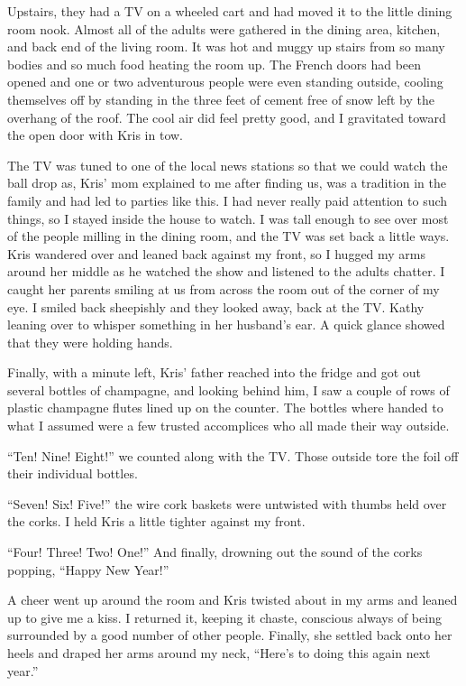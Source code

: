 Upstairs, they had a TV on a wheeled cart and had moved it to the little dining room nook.  Almost all of the adults were gathered in the dining area, kitchen, and back end of the living room.  It was hot and muggy up stairs from so many bodies and so much food heating the room up.  The French doors had been opened and one or two adventurous people were even standing outside, cooling themselves off by standing in the three feet of cement free of snow left by the overhang of the roof.  The cool air did feel pretty good, and I gravitated toward the open door with Kris in tow.

The TV was tuned to one of the local news stations so that we could watch the ball drop as, Kris' mom explained to me after finding us, was a tradition in the family and had led to parties like this.  I had never really paid attention to such things, so I stayed inside the house to watch.  I was tall enough to see over most of the people milling in the dining room, and the TV was set back a little ways.  Kris wandered over and leaned back against my front, so I hugged my arms around her middle as he watched the show and listened to the adults chatter.  I caught her parents smiling at us from across the room out of the corner of my eye.  I smiled back sheepishly and they looked away, back at the TV.  Kathy leaning over to whisper something in her husband's ear.  A quick glance showed that they were holding hands.

Finally, with a minute left, Kris' father reached into the fridge and got out several bottles of champagne, and looking behind him, I saw a couple of rows of plastic champagne flutes lined up on the counter.  The bottles where handed to what I assumed were a few trusted accomplices who all made their way outside.

``Ten!  Nine!  Eight!'' we counted along with the TV.  Those outside tore the foil off their individual bottles.

``Seven!  Six!  Five!'' the wire cork baskets were untwisted with thumbs held over the corks.  I held Kris a little tighter against my front.

``Four!  Three!  Two!  One!''  And finally, drowning out the sound of the corks popping, ``Happy New Year!''

A cheer went up around the room and Kris twisted about in my arms and leaned up to give me a kiss.  I returned it, keeping it chaste, conscious always of being surrounded by a good number of other people.  Finally, she settled back onto her heels and draped her arms around my neck, ``Here's to doing this again next year.''

